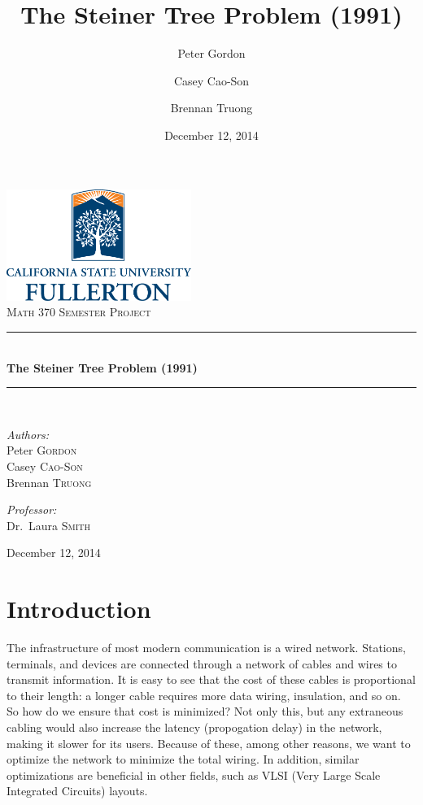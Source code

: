 \documentclass[12pt,letterpaper]{article}
\title{The Steiner Tree Problem (1991)}
\author{Peter Gordon \and Casey Cao-Son \and Brennan Truong}
\date{December 12, 2014}
\theoremstyle{definition}\newtheorem{defn}[defncounter]{Definition}
\theoremstyle{remark}\newtheorem*{remark}{Remark}
\newcommand{\HRule}{\rule{\linewidth}{0.5mm}}
\begin{document}
\begin{titlepage}
\begin{center}

\includegraphics[width=0.45\textwidth]{CSUFLogo}~\\[1cm]


\textsc{\Large Math 370 Semester Project}\\[0.5cm]

\HRule \\[0.4cm]
{ \huge \bfseries The Steiner Tree Problem (1991) \\[0.4cm] }

\HRule \\[1.5cm]

\noindent
\begin{minipage}[t]{0.4\textwidth}
\begin{flushright} \large
\emph{Authors:}\\
Peter \textsc{Gordon} \\
Casey \textsc{Cao-Son} \\
Brennan \textsc{Truong}
\end{flushright}
\end{minipage}
\hfill
\begin{minipage}[t]{0.4\textwidth}
\begin{flushleft} \large
\emph{Professor:} \\
Dr.~Laura \textsc{Smith}
\end{flushleft}
\end{minipage}
\vfill

{\large December 12, 2014}

\end{center}
\end{titlepage}


\section{Introduction}
The infrastructure of most modern communication is a wired network. Stations, terminals, and devices are connected through a 
network of cables and wires to transmit information. It is easy to see that the cost of these cables is proportional to their 
length: a longer cable requires more data wiring, insulation, and so on. So how do we ensure that cost is minimized? Not only 
this, but any extraneous cabling would also increase the latency (propogation delay) in the network, making it slower for its 
users. Because of these, among other reasons, we want to optimize the network to minimize the total wiring. In addition,
similar optimizations are beneficial in other fields, such as VLSI (Very Large Scale Integrated Circuits) layouts.
\end{document}
